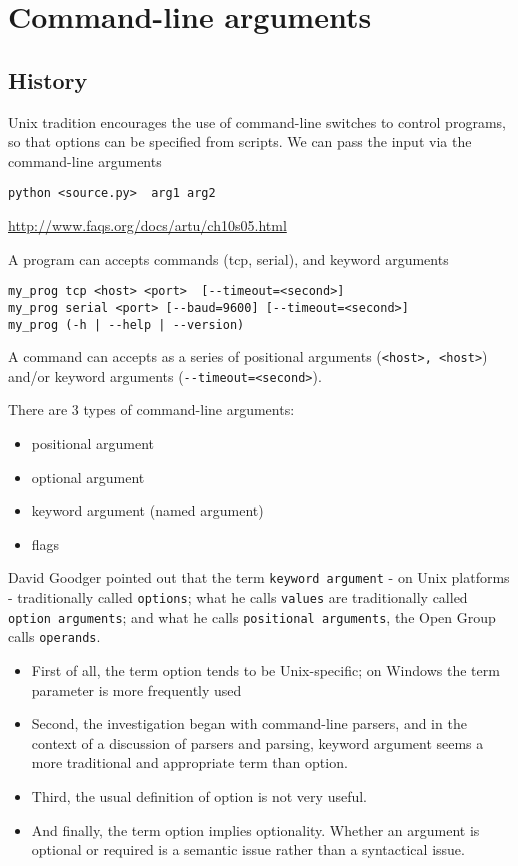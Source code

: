 \chapter{Command-line arguments}
\label{chap:command-line-argument}

\section{History}

Unix tradition encourages the use of command-line switches to control programs, so that options can be specified from scripts.
We can pass the input via the command-line arguments
\begin{verbatim}
python <source.py>  arg1 arg2
\end{verbatim}
\url{http://www.faqs.org/docs/artu/ch10s05.html}

A program can accepts commands (tcp, serial), and keyword arguments
\begin{verbatim}
my_prog tcp <host> <port>  [--timeout=<second>]
my_prog serial <port> [--baud=9600] [--timeout=<second>]
my_prog (-h | --help | --version)
\end{verbatim}
A command can accepts as a series of positional arguments (\verb!<host>, <host>!) 
and/or keyword arguments (\verb!--timeout=<second>!).


There are 3 types of command-line arguments:
\begin{itemize}
  \item positional argument
  \item optional argument
  \item keyword argument (named argument)
  \item flags
\end{itemize}

\begin{mdframed}

David Goodger pointed out that the term \verb!keyword argument! - on Unix
platforms - traditionally called \verb!options!;  what he calls \verb!values!
are traditionally called \verb!option arguments!; and what he calls
\verb!positional arguments!, the Open Group calls \verb!operands!.
\begin{itemize}
  \item First of all, the term option tends to be Unix-specific; on Windows the term parameter is more frequently used
  \item Second, the investigation began with command-line parsers, and in the context of a discussion of parsers and parsing, keyword argument seems a more traditional and appropriate term than option. 
  \item Third, the usual definition of option is not very useful.
  \item And finally, the term option implies optionality.  Whether an argument is optional or required is a semantic issue rather than a syntactical issue. 
\end{itemize}

\end{mdframed}

